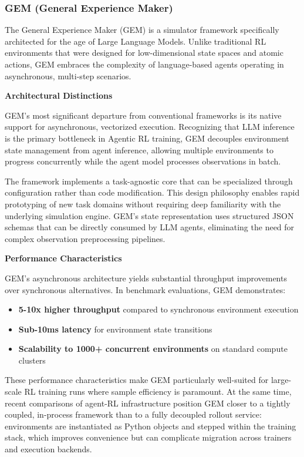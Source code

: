 \subsubsection{GEM (General Experience Maker)}

The General Experience Maker (GEM) is a simulator framework specifically architected for the age of Large Language Models. Unlike traditional RL environments that were designed for low-dimensional state spaces and atomic actions, GEM embraces the complexity of language-based agents operating in asynchronous, multi-step scenarios.

\textbf{Architectural Distinctions}

GEM's most significant departure from conventional frameworks is its native support for asynchronous, vectorized execution. Recognizing that LLM inference is the primary bottleneck in Agentic RL training, GEM decouples environment state management from agent inference, allowing multiple environments to progress concurrently while the agent model processes observations in batch.

The framework implements a task-agnostic core that can be specialized through configuration rather than code modification. This design philosophy enables rapid prototyping of new task domains without requiring deep familiarity with the underlying simulation engine. GEM's state representation uses structured JSON schemas that can be directly consumed by LLM agents, eliminating the need for complex observation preprocessing pipelines.

\textbf{Performance Characteristics}

GEM's asynchronous architecture yields substantial throughput improvements over synchronous alternatives. In benchmark evaluations, GEM demonstrates:

\begin{itemize}
    \item \textbf{5-10x higher throughput} compared to synchronous environment execution
    \item \textbf{Sub-10ms latency} for environment state transitions
    \item \textbf{Scalability to 1000+ concurrent environments} on standard compute clusters

\end{itemize}
These performance characteristics make GEM particularly well-suited for large-scale RL training runs where sample efficiency is paramount. At the same time, recent comparisons of agent-RL infrastructure position GEM closer to a tightly coupled, in-process framework than to a fully decoupled rollout service: environments are instantiated as Python objects and stepped within the training stack, which improves convenience but can complicate migration across trainers and execution backends.

